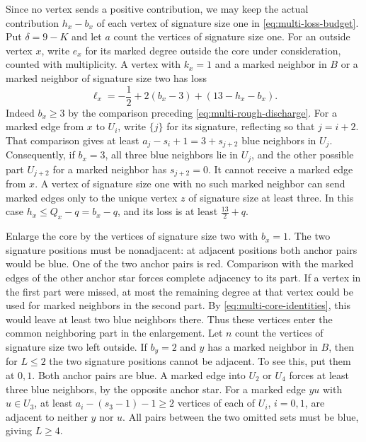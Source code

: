 Since no vertex sends a positive contribution, we may keep the actual
contribution $h_x-b_x$ of each vertex of signature size one in
\eqref{eq:multi-loss-budget}. Put $\delta=9-K$ and
let $a$ count the vertices of signature size one. For an outside
vertex $x$, write $e_x$ for its marked degree outside the core under
consideration, counted with multiplicity. A vertex with $k_x=1$ and a marked
neighbor in $B$ or a marked neighbor of signature size two has loss
\[
 \ell_x=-\frac{1}{2}+2(b_x-3)+(13-h_x-b_x).
\]
Indeed $b_x\ge3$ by the comparison preceding
\eqref{eq:multi-rough-discharge}. For a marked edge from $x$ to
$U_i$, write $\{j\}$ for its signature, reflecting so that $j=i+2$.
That comparison gives at least $a_j-s_i+1=3+s_{j+2}$ blue neighbors
in $U_j$. Consequently, if $b_x=3$, all three blue neighbors lie in
$U_j$, and the other possible part $U_{j+2}$ for a marked neighbor
has $s_{j+2}=0$. It cannot receive a marked edge from $x$. A vertex
of signature size one with no such marked neighbor can send marked
edges only to the unique vertex $z$ of signature size at least three.
In this case $h_x\le Q_x-q=b_x-q$, and its loss is at least
$\frac{13}{2}+q$.

Enlarge the core by the vertices of signature size two with $b_x=1$.
The two signature positions must be nonadjacent: at adjacent positions
both anchor pairs would be blue. One of the two anchor pairs is red.
Comparison with the marked edges of the other anchor star forces
complete adjacency to its part. If a vertex in the first part were
missed, at most the remaining degree at that vertex could be used
for marked neighbors in the second part. By
\eqref{eq:multi-core-identities}, this would leave at least two blue
neighbors there. Thus these vertices enter the common neighboring part in the enlargement.
Let $n$ count the vertices of signature size two left outside.
If $b_y=2$ and $y$ has a marked neighbor in $B$, then for $L\le2$
the two signature positions cannot be adjacent. To see this, put them
at $0,1$. Both anchor pairs are blue. A marked edge into $U_2$ or
$U_4$ forces at least three blue neighbors, by the opposite anchor
star. For a marked edge $yu$ with $u\in U_3$, at least
$a_i-(s_3-1)-1\ge2$ vertices of each of $U_i$, $i=0,1$, are
adjacent to neither $y$ nor $u$. All pairs between the two omitted
sets must be blue, giving $L\ge4$.

